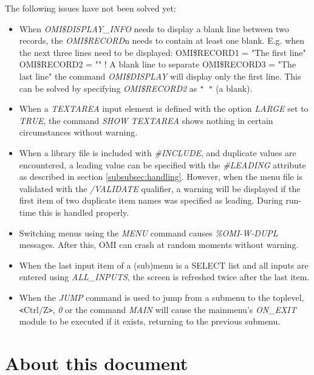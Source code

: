 \documentclass[a4paper]{book}
\newcommand{\lt}{\texttt{<}}
\newcommand{\gt}{\texttt{>}}
\renewcommand{\indent}{\hspace*{5mm}}
\begin{document}
The following issues have not been solved yet: \\
\begin{itemize}
\item When \textsl{OMI{\$}DISPLAY{\_}INFO} needs to display a blank line between two 
records, the \textsl{OMI{\$}RECORD}n needs to contain at least one blank. \newline
E.g. when the next three lines need to be displayed:\newline
\indent\textsf{OMI{\$}RECORD1 = "The first line"} \newline
\indent\textsf{OMI{\$}RECORD2 = "" ! A blank line to separate} \newline
\indent\textsf{OMI{\$}RECORD3 = "The last line"} \newline
the command \textsl{OMI{\$}DISPLAY} will display only the first line. This can be 
solved by specifying \textsl{OMI{\$}RECORD2} as \verb*|" "| (a blank).
\item When a \textsl{TEXTAREA} input element is defined with the option \textsl{LARGE} set to \textsl{TRUE}, 
the command \textsl{SHOW TEXTAREA} shows nothing in certain circumstances without 
warning.
\item When a library file is included with \textsl{{\#}INCLUDE}, and duplicate values are 
encountered, a leading value can be specified with the \textsl{{\#}LEADING} attribute 
as described in section \ref{subsubsec:handling}. However, when the 
menu file is validated with the \textsl{/VALIDATE} qualifier, a warning will be 
displayed if the first item of two duplicate item names was specified as 
leading. During run-time this is handled properly.
\item Switching menus using the \textsl{MENU} command causes \textsl{\%OMI-W-DUPL}
messages. After this, OMI can crash at random moments without warning.
\item When the last input item of a (sub)menu is a SELECT list and all inputs are entered
using \textsl{ALL{\_}INPUTS}, the screen is refreshed twice after the last item.
\item When the \textsl{JUMP} command is used to jump from a submenu to the toplevel, \lt Ctrl/Z\gt{}, \textsl{0} or the command \textsl{MAIN} will cause the mainmenu's \textsl{ON{\_}EXIT} module to be executed if it exists, returning to the previous submenu.
\end{itemize}

\section*{About this document}
\end{document}
